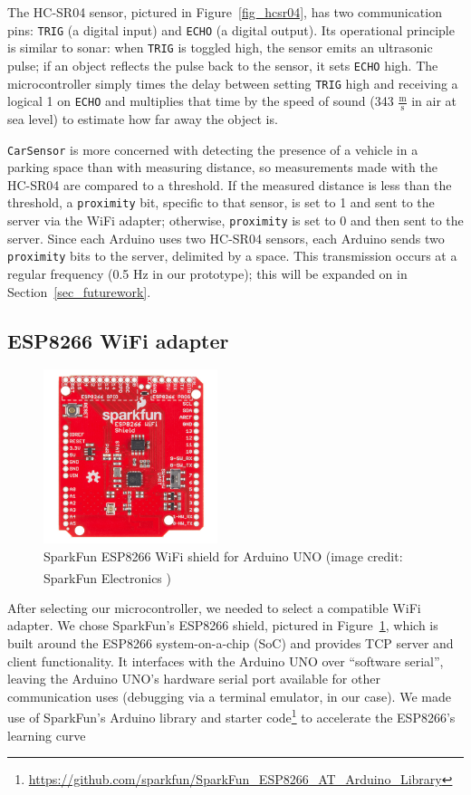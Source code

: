 \documentclass[conference]{IEEEtran}
\begin{document}
The HC-SR04 sensor, pictured in Figure~\ref{fig_hcsr04}, has two communication pins: \texttt{TRIG} (a digital input) and \texttt{ECHO} (a digital output). Its operational principle is similar to sonar: when \texttt{TRIG} is toggled high, the sensor emits an ultrasonic pulse; if an object reflects the pulse back to the sensor, it sets \texttt{ECHO} high. The microcontroller simply times the delay between setting \texttt{TRIG} high and receiving a logical 1 on \texttt{ECHO} and multiplies that time by the speed of sound (343 $\frac{\textrm{m}}{\textrm{s}}$ in air at sea level) to estimate how far away the object is.

\texttt{CarSensor} is more concerned with detecting the presence of a vehicle in a parking space than with measuring distance, so measurements made with the HC-SR04 are compared to a threshold. If the measured distance is less than the threshold, a \texttt{proximity} bit, specific to that sensor, is set to 1 and sent to the server via the WiFi adapter; otherwise, \texttt{proximity} is set to 0 and then sent to the server. Since each Arduino uses two HC-SR04 sensors, each Arduino sends two \texttt{proximity} bits to the server, delimited by a space. This transmission occurs at a regular frequency (0.5 Hz in our prototype); this will be expanded on in Section~\ref{sec_futurework}.

\subsection{ESP8266 WiFi adapter}

\begin{figure}[h]
	\centering
	\includegraphics[width=2.0in]{esp8266.jpg}
	\caption{SparkFun ESP8266 WiFi shield for Arduino UNO (image credit: SparkFun Electronics \textsuperscript{\textregistered})}
	\label{fig_esp8266}
\end{figure}

After selecting our microcontroller, we needed to select a compatible WiFi adapter. We chose SparkFun's ESP8266 shield, pictured in Figure~\ref{fig_esp8266}, which is built around the ESP8266 system-on-a-chip (SoC) and provides TCP server and client functionality. It interfaces with the Arduino UNO over ``software serial'', leaving the Arduino UNO's hardware serial port available for other communication uses (debugging via a terminal emulator, in our case). We made use of SparkFun's Arduino library and starter code\footnote{\url{https://github.com/sparkfun/SparkFun_ESP8266_AT_Arduino_Library}} to accelerate the ESP8266's learning curve
\end{document}
